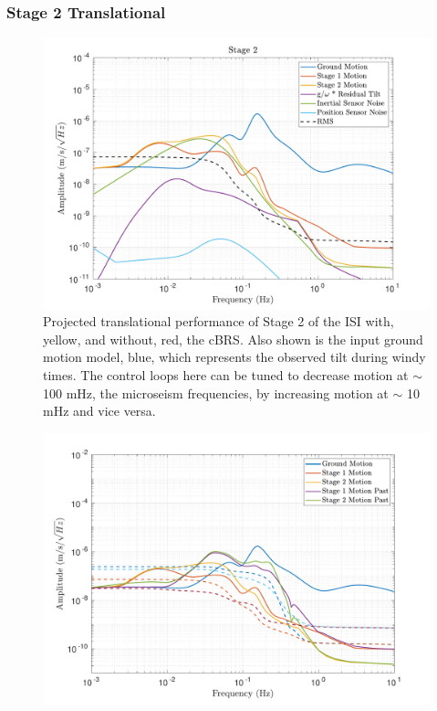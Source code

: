 \documentclass [12pt, proquest]{uwthesis}[2019]
\begin{document}
\subsubsection{Stage 2 Translational}

\begin{figure}[!h]
\begin{center}
\includegraphics[width=\textwidth]{cBRS_Model_ST2X.pdf}
\caption{Projected translational performance of Stage 2 of the ISI with, yellow, and without, red, the cBRS. Also shown is the input ground motion model, blue, which represents the observed tilt during windy times. The control loops here can be tuned to decrease motion at $\sim$ 100 mHz, the microseism frequencies, by increasing motion at $\sim$ 10 mHz and vice versa.}
\label{cBRS2X}
\end{center}
\end{figure}

\begin{figure}[!h]
\begin{center}
\includegraphics[width=\textwidth]{cBRS_Model_CompX.pdf}
\caption{}
\label{cBRSCompR}
\end{center}
\end{figure}
\end{document}
